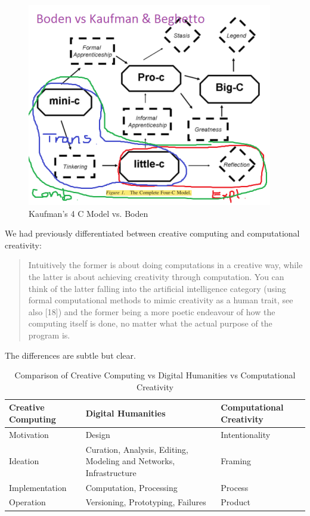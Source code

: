 \begin{figure}[htb] %
  \centering
  \includegraphics[width=\linewidth]{images/4CBoden.png}
\caption[Kaufman vs Boden]{Kaufman's 4 C Model vs. Boden}
\label{fig:4CB}
\end{figure}


We had previously differentiated between creative computing and computational creativity:

\begin{quote}
Intuitively the former is about doing computations in a creative way, while the latter is about achieving creativity through computation. You can think of the latter falling into the artificial intelligence category (using formal computational methods to mimic creativity as a human trait, see also [18]) and the former being a more poetic endeavour of how the computing itself is done, no matter what the actual purpose of the program is. \autocite{Hugill2013}
\end{quote}

The differences are subtle but clear.

\begin{table}[htbp]
\centering
\begin{tabular}{|l|p{5cm}|l|}
\hline
\textbf{Creative Computing} & \textbf{Digital Humanities} & \textbf{Computational Creativity} \\ \hline
Motivation  & Design & Intentionality \\ \hline
Ideation & Curation, Analysis, Editing, Modeling and Networks, Infrastructure & Framing \\ \hline
Implementation & Computation, Processing & Process \\ \hline
Operation & Versioning, Prototyping, Failures & Product \\ \hline
\end{tabular}
\caption[Creative Computing vs Digital Humanities vs Computational Creativity]{Comparison of Creative Computing vs Digital Humanities vs Computational Creativity}
\end{table}


